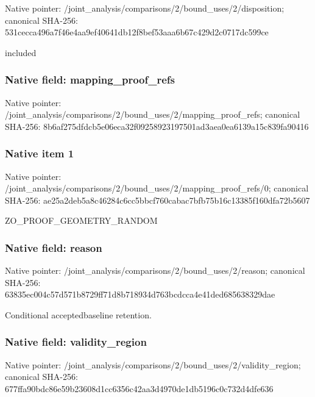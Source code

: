 \documentclass[10pt,a4paper]{article}
\begin{document}
Native pointer: /joint\_analysis/comparis\allowbreak{}ons/2/bound\_uses/2/dispo\allowbreak{}sition; canonical SHA-256: 531cecca496a7f46e4aa9ef4\allowbreak{}0641db12f8bef53aaa6b67c4\allowbreak{}29d2c0717dc599ce


included


\subsubsection{Native field: mapping\_proof\_refs}


Native pointer: /joint\_analysis/comparis\allowbreak{}ons/2/bound\_uses/2/mappi\allowbreak{}ng\_proof\_refs; canonical SHA-256: 8b6af275dfdcb5e06eca32f0\allowbreak{}9258923197501ad3aea0ea61\allowbreak{}39a15c839fa90416



\subsubsection{Native item 1}


Native pointer: /joint\_analysis/comparis\allowbreak{}ons/2/bound\_uses/2/mappi\allowbreak{}ng\_proof\_refs/0; canonical SHA-256: ae25a2deb5a8c46284c6cc5b\allowbreak{}bcf760cabac7bfb75b16c133\allowbreak{}85f160dfa72b5607


ZO\_PROOF\_GEOMETRY\_RANDOM


\subsubsection{Native field: reason}


Native pointer: /joint\_analysis/comparis\allowbreak{}ons/2/bound\_uses/2/reaso\allowbreak{}n; canonical SHA-256: 63835ec004c57d571b8729ff\allowbreak{}71d8b718934d763bcdcca4e4\allowbreak{}1ded685638329dae


Conditional acceptedbaseline retention.


\subsubsection{Native field: validity\_region}


Native pointer: /joint\_analysis/comparis\allowbreak{}ons/2/bound\_uses/2/valid\allowbreak{}ity\_region; canonical SHA-256: 677ffa90bdc86e59b23608d1\allowbreak{}cc6356c42aa3d4970de1db51\allowbreak{}96c0c732d4dfe636
\end{document}
